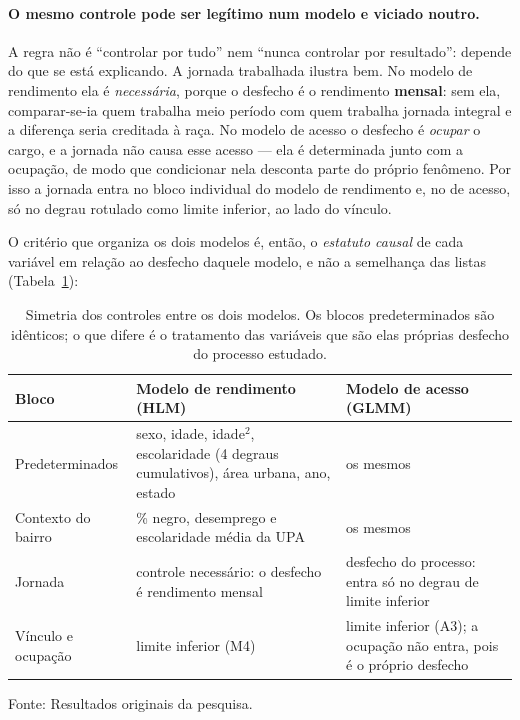 \documentclass[12pt, a4paper, oneside]{article}
\begin{document}
\paragraph{O mesmo controle pode ser legítimo num modelo e viciado noutro.}
A regra não é ``controlar por tudo'' nem ``nunca controlar por resultado'': depende do
que se está explicando. A jornada trabalhada ilustra bem. No modelo de rendimento ela
é \emph{necessária}, porque o desfecho é o rendimento \textbf{mensal}: sem ela,
comparar-se-ia quem trabalha meio período com quem trabalha jornada integral e a
diferença seria creditada à raça. No modelo de acesso o desfecho é \emph{ocupar} o
cargo, e a jornada não causa esse acesso --- ela é determinada junto com a ocupação,
de modo que condicionar nela desconta parte do próprio fenômeno. Por isso a jornada
entra no bloco individual do modelo de rendimento e, no de acesso, só no degrau
rotulado como limite inferior, ao lado do vínculo.

O critério que organiza os dois modelos é, então, o \emph{estatuto causal} de cada
variável em relação ao desfecho daquele modelo, e não a semelhança das listas
(Tabela~\ref{tab:simetria}):

\begin{table}[!ht]
\centering
\caption{Simetria dos controles entre os dois modelos. Os blocos predeterminados são
idênticos; o que difere é o tratamento das variáveis que são elas próprias desfecho
do processo estudado.}
\label{tab:simetria}
\small
\begin{tabular}{p{3.4cm}p{4.6cm}p{4.6cm}}
\toprule
Bloco & Modelo de rendimento (HLM) & Modelo de acesso (GLMM) \\
\midrule
Predeterminados & sexo, idade, idade$^2$, escolaridade (4 degraus
cumulativos), área urbana, ano, estado & os mesmos \\
\addlinespace[3pt]
Contexto do bairro & \% negro, desemprego e escolaridade média da UPA & os mesmos \\
\addlinespace[3pt]
Jornada & controle necessário: o desfecho é rendimento mensal & desfecho do processo:
entra só no degrau de limite inferior \\
\addlinespace[3pt]
Vínculo e ocupação & limite inferior (M4) & limite inferior (A3); a ocupação não entra,
pois é o próprio desfecho \\
\bottomrule
\end{tabular}
\par\smallskip\footnotesize Fonte: Resultados originais da pesquisa.
\end{table}
\end{document}
